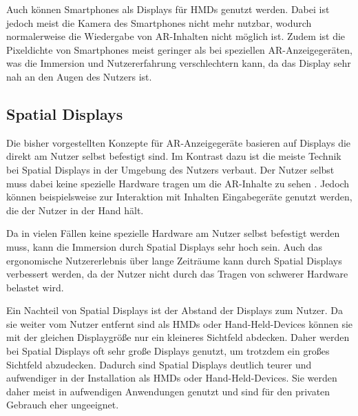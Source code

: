   Auch können Smartphones als Displays für HMDs genutzt werden.
  Dabei ist jedoch meist die Kamera des Smartphones nicht mehr nutzbar, wodurch normalerweise die Wiedergabe von AR-Inhalten nicht möglich ist.
  Zudem ist die Pixeldichte von Smartphones meist geringer als bei speziellen AR-Anzeigegeräten, was die Immersion und Nutzererfahrung verschlechtern kann, da das Display sehr nah an den Augen des Nutzers ist.

  

  \subsection{Spatial Displays}

  Die bisher vorgestellten Konzepte für AR-Anzeigegeräte basieren auf Displays die direkt am Nutzer selbst befestigt sind.
  Im Kontrast dazu ist die meiste Technik bei Spatial Displays in der Umgebung des Nutzers verbaut.
  Der Nutzer selbst muss dabei keine spezielle Hardware tragen um die AR-Inhalte zu sehen \autocite[]{bimber2006modern}.
  Jedoch können beispielsweise zur Interaktion mit Inhalten Eingabegeräte genutzt werden, die der Nutzer in der Hand hält.

  Da in vielen Fällen keine spezielle Hardware am Nutzer selbst befestigt werden muss, kann die Immersion durch Spatial Displays sehr hoch sein.
  Auch das ergonomische Nutzererlebnis über lange Zeiträume kann durch Spatial Displays verbessert werden, da der Nutzer nicht durch das Tragen von schwerer Hardware belastet wird.

  Ein Nachteil von Spatial Displays ist der Abstand der Displays zum Nutzer.
  Da sie weiter vom Nutzer entfernt sind als HMDs oder Hand-Held-Devices können sie mit der gleichen Displaygröße nur ein kleineres Sichtfeld abdecken.
  Daher werden bei Spatial Displays oft sehr große Displays genutzt, um trotzdem ein großes Sichtfeld abzudecken.
  Dadurch sind Spatial Displays deutlich teurer und aufwendiger in der Installation als HMDs oder Hand-Held-Devices.
  Sie werden daher meist in aufwendigen Anwendungen genutzt und sind für den privaten Gebrauch eher ungeeignet.